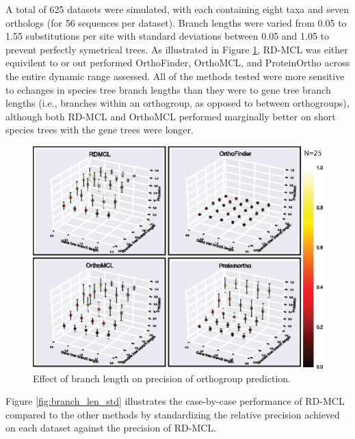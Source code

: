 \documentclass[twocolumn]{bmcart}%
\begin{document}

A total of 625 datasets were simulated, with each containing eight taxa and seven orthologs (for 56 sequences per dataset). Branch lengths were varied from 0.05 to 1.55 substitutions per site with standard deviations between 0.05 and 1.05 to prevent perfectly symetrical trees. As illustrated in Figure \ref{fig:branch_len_3d}, RD-MCL was either equivilent to or out performed OrthoFinder, OrthoMCL, and ProteinOrtho across the entire dynamic range assessed. All of the methods tested were more sensitive to echanges in species tree branch lengths than they were to gene tree branch lengths (i.e., branches within an orthogroup, as opposed to between orthogroups), although both RD-MCL and OrthoMCL performed marginally better on short species trees with the gene trees were longer.

\begin{figure}[t]
  \begin{center}
  \includegraphics[height=0.25\textheight]{../figures/branch_len_3D_scatter.eps}
\end{center}
\caption{Effect of branch length on precision of orthogroup prediction.}
\label{fig:branch_len_3d}
\end{figure}

Figure \ref{fig:branch_len_std} illustrates the case-by-case performance of RD-MCL compared to the other methods by standardizing the relative precision achieved on each dataset against the precision of RD-MCL.
\end{document}

